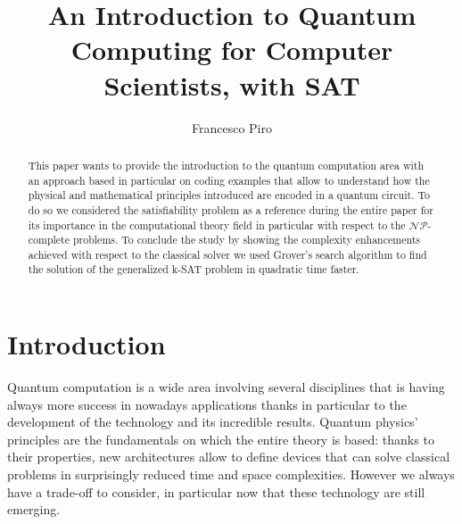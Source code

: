 \documentclass[english]{article}
\begin{document}
	\title{An Introduction to Quantum Computing for Computer Scientists, with SAT}
	\author{Francesco Piro}
	\maketitle
	
	\begin{abstract}
		This paper wants to provide the introduction to the quantum computation area with an approach based in particular on coding examples that allow to understand how the physical and mathematical principles introduced are encoded in a quantum circuit. To do so we considered the satisfiability problem as a reference during the entire paper for its importance in the computational theory field in particular with respect to the $\mathcal{N}\mathcal{P}$-complete problems. To conclude the study by showing the complexity enhancements achieved with respect to the classical solver we used Grover's search algorithm to find the solution of the generalized k-SAT problem in quadratic time faster.
	\end{abstract}

	
	\section*{Introduction}
	\label{sec:introduction}
	Quantum computation is a wide area involving several disciplines that is having always more success in nowadays applications thanks in particular to the development of the technology and its incredible results. Quantum physics' principles are the fundamentals on which the entire theory is based: thanks to their properties, new architectures allow to define devices that can solve classical problems in surprisingly reduced time and space complexities. However we always have a trade-off to consider, in particular now that these technology are still emerging.\\
	
\end{document}
